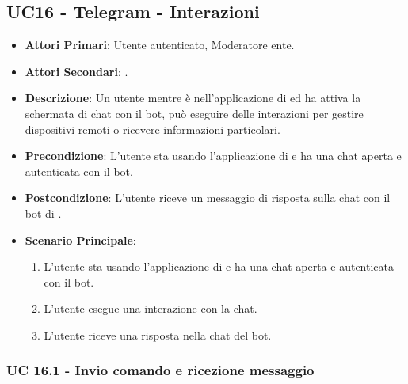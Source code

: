 \subsection{UC16 - Telegram - Interazioni}
		
		
	\begin{itemize}
		\item \textbf{Attori Primari}: Utente autenticato, Moderatore ente.
		\item \textbf{Attori Secondari}: .
		\item \textbf{Descrizione}: Un utente mentre è nell'applicazione di  ed ha attiva la schermata di chat con il bot, può eseguire delle interazioni per gestire dispositivi remoti o ricevere informazioni particolari. 
		\item \textbf{Precondizione}: L'utente sta usando l'applicazione di  e ha una chat aperta e autenticata con il bot.
		\item \textbf{Postcondizione}: L'utente riceve un messaggio di risposta sulla chat con il bot di .
		\item \textbf{Scenario Principale}:
		\begin{enumerate}
			\item L'utente sta usando l'applicazione di  e ha una chat aperta e autenticata con il bot. 
			\item L'utente esegue una interazione con la chat.
			\item L'utente riceve una risposta nella chat del bot.
		\end{enumerate}
	\end{itemize}
	
	\subsubsection{UC 16.1 - Invio comando e ricezione messaggio}

